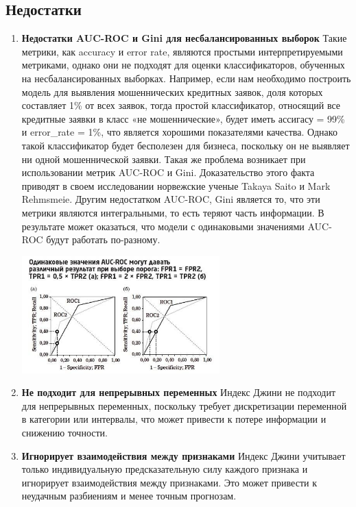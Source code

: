 \documentclass{article}
\begin{document}
\subsection*{Недостатки}

\begin{enumerate}
 \item {\bf Недостатки AUC-ROC и Gini для несбалансированных выборок}
    Такие метрики, как accuracy и error rate, являются простыми интерпретируемыми метриками, однако они
    не подходят для оценки классификаторов, обученных на несбалансированных выборках. Например,
    если нам необходимо построить модель для выявления мошеннических кредитных заявок, доля которых
    составляет 1\% от всех заявок, тогда простой классификатор, относящий все кредитные заявки в класс «не мошеннические», будет иметь ассигасу = 99\% и error\_rate = 1\%, что является хорошими показателями качества. Однако такой классификатор будет бесполезен для бизнеса, поскольку он не выявляет ни одной мошеннической заявки.
    Такая же проблема возникает при использовании метрик AUC-ROC и Gini. Доказательство этого факта приводят в своем исследовании норвежские ученые Takaya Saito и Mark Rehmsmeie.
    Другим недостатком AUC-ROC, Gini является то, что эти метрики являются
    интегральными, то есть теряют часть информации. В результате может оказаться, что модели с
    одинаковыми значениями AUC-ROC будут работать по-разному.
    
    \begin{center}
        \includegraphics[width=0.6\textwidth]{pics/fff.jpeg}
    \end{center} 
    \item {\bf Не подходит для непрерывных переменных} Индекс Джини не подходит для непрерывных переменных, поскольку требует дискретизации переменной в категории или интервалы, что может привести к потере информации и снижению точности.
    \item {\bf Игнорирует взаимодействия между признаками} Индекс Джини учитывает только индивидуальную предсказательную силу каждого признака и игнорирует взаимодействия между признаками. Это может привести к неудачным разбиениям и менее точным прогнозам.
\end{enumerate}
\end{document}
